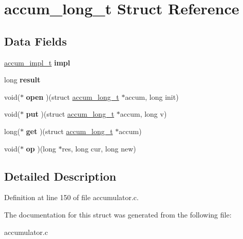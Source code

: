 \hypertarget{structaccum__long__t}{\section{accum\-\_\-long\-\_\-t Struct Reference}
\label{structaccum__long__t}
}
\subsection*{Data Fields}
\begin{DoxyCompactItemize}
\item 
\hypertarget{structaccum__long__t_aa0694fef9204bbc22e3e8d6a0ddd3d10}{\hyperlink{structaccum__impl__t}{accum\-\_\-impl\-\_\-t} {\bfseries impl}}\label{structaccum__long__t_aa0694fef9204bbc22e3e8d6a0ddd3d10}

\item 
\hypertarget{structaccum__long__t_ac40898f6ca79d20f8a228c253d95b0e0}{long {\bfseries result}}\label{structaccum__long__t_ac40898f6ca79d20f8a228c253d95b0e0}

\item 
\hypertarget{structaccum__long__t_a431845b157bbc7e2e18480cead60cfd9}{void($\ast$ {\bfseries open} )(struct \hyperlink{structaccum__long__t}{accum\-\_\-long\-\_\-t} $\ast$accum, long init)}\label{structaccum__long__t_a431845b157bbc7e2e18480cead60cfd9}

\item 
\hypertarget{structaccum__long__t_af8ee6ed0140243faf27c5c5bf459659b}{void($\ast$ {\bfseries put} )(struct \hyperlink{structaccum__long__t}{accum\-\_\-long\-\_\-t} $\ast$accum, long v)}\label{structaccum__long__t_af8ee6ed0140243faf27c5c5bf459659b}

\item 
\hypertarget{structaccum__long__t_a18673fcdf6b9055381bd5736723e591a}{long($\ast$ {\bfseries get} )(struct \hyperlink{structaccum__long__t}{accum\-\_\-long\-\_\-t} $\ast$accum)}\label{structaccum__long__t_a18673fcdf6b9055381bd5736723e591a}

\item 
\hypertarget{structaccum__long__t_a1de60021092acd897445147cb99e1914}{void($\ast$ {\bfseries op} )(long $\ast$res, long cur, long new)}\label{structaccum__long__t_a1de60021092acd897445147cb99e1914}

\end{DoxyCompactItemize}


\subsection{Detailed Description}


Definition at line 150 of file accumulator.\-c.



The documentation for this struct was generated from the following file\-:\begin{DoxyCompactItemize}
\item 
accumulator.\-c\end{DoxyCompactItemize}
